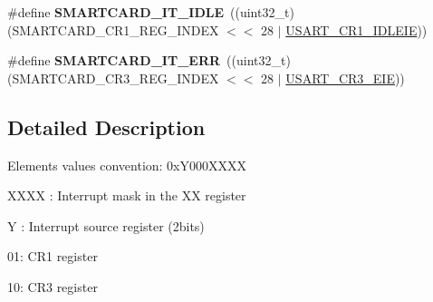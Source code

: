 \begin{DoxyCompactItemize}
\item 
\#define {\bfseries S\+M\+A\+R\+T\+C\+A\+R\+D\+\_\+\+I\+T\+\_\+\+I\+D\+LE}~((uint32\+\_\+t)(S\+M\+A\+R\+T\+C\+A\+R\+D\+\_\+\+C\+R1\+\_\+\+R\+E\+G\+\_\+\+I\+N\+D\+EX $<$$<$ 28 $\vert$ \hyperlink{group___peripheral___registers___bits___definition_ga5221d09eebd12445a20f221bf98066f8}{U\+S\+A\+R\+T\+\_\+\+C\+R1\+\_\+\+I\+D\+L\+E\+IE}))\hypertarget{group___smart_card___interrupt__definition_ga0b1a5f7e611a976c71168a5b9e3a1f0e}{}\label{group___smart_card___interrupt__definition_ga0b1a5f7e611a976c71168a5b9e3a1f0e}

\item 
\#define {\bfseries S\+M\+A\+R\+T\+C\+A\+R\+D\+\_\+\+I\+T\+\_\+\+E\+RR}~((uint32\+\_\+t)(S\+M\+A\+R\+T\+C\+A\+R\+D\+\_\+\+C\+R3\+\_\+\+R\+E\+G\+\_\+\+I\+N\+D\+EX $<$$<$ 28 $\vert$ \hyperlink{group___peripheral___registers___bits___definition_gaaed1a39c551b1641128f81893ff558d0}{U\+S\+A\+R\+T\+\_\+\+C\+R3\+\_\+\+E\+IE}))\hypertarget{group___smart_card___interrupt__definition_ga751761f820948ee230b30a244ca85725}{}\label{group___smart_card___interrupt__definition_ga751761f820948ee230b30a244ca85725}

\end{DoxyCompactItemize}


\subsection{Detailed Description}
Elements values convention\+: 0x\+Y000\+X\+X\+XX
\begin{DoxyItemize}
\item X\+X\+XX \+: Interrupt mask in the XX register
\item Y \+: Interrupt source register (2bits)
\begin{DoxyItemize}
\item 01\+: C\+R1 register
\item 10\+: C\+R3 register 
\end{DoxyItemize}
\end{DoxyItemize}